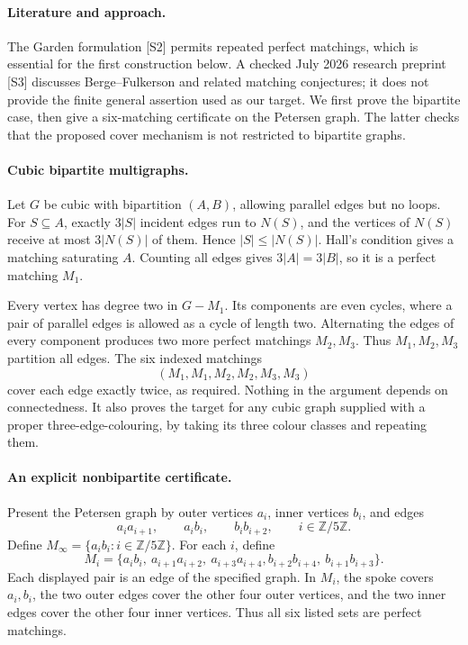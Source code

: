 \documentclass[11pt,a4paper]{article}
\begin{document}
\paragraph{Literature and approach.}
The Garden formulation [S2] permits repeated perfect matchings, which is essential for the first construction below. A checked July 2026 research preprint [S3] discusses Berge--Fulkerson and related matching conjectures; it does not provide the finite general assertion used as our target. We first prove the bipartite case, then give a six-matching certificate on the Petersen graph. The latter checks that the proposed cover mechanism is not restricted to bipartite graphs.

\paragraph{Cubic bipartite multigraphs.}
Let $G$ be cubic with bipartition $(A,B)$, allowing parallel edges but no loops. For $S\subseteq A$, exactly $3|S|$ incident edges run to $N(S)$, and the vertices of $N(S)$ receive at most $3|N(S)|$ of them. Hence $|S|\le |N(S)|$. Hall's condition gives a matching saturating $A$. Counting all edges gives $3|A|=3|B|$, so it is a perfect matching $M_1$.

Every vertex has degree two in $G-M_1$. Its components are even cycles, where a pair of parallel edges is allowed as a cycle of length two. Alternating the edges of every component produces two more perfect matchings $M_2,M_3$. Thus $M_1,M_2,M_3$ partition all edges. The six indexed matchings
\[
 (M_1,M_1,M_2,M_2,M_3,M_3)
\]
cover each edge exactly twice, as required. Nothing in the argument depends on connectedness. It also proves the target for any cubic graph supplied with a proper three-edge-colouring, by taking its three colour classes and repeating them.

\paragraph{An explicit nonbipartite certificate.}
Present the Petersen graph by outer vertices $a_i$, inner vertices $b_i$, and edges
\[
 a_i a_{i+1},\qquad a_i b_i,\qquad b_i b_{i+2},\qquad i\in\mathbb Z/5\mathbb Z.
\]
Define $M_\infty=\{a_i b_i:i\in\mathbb Z/5\mathbb Z\}$. For each $i$, define
\[
 M_i=\{a_i b_i,\ a_{i+1}a_{i+2},\ a_{i+3}a_{i+4},
 b_{i+2}b_{i+4},\ b_{i+1}b_{i+3}\}.
\]
Each displayed pair is an edge of the specified graph. In $M_i$, the spoke covers $a_i,b_i$, the two outer edges cover the other four outer vertices, and the two inner edges cover the other four inner vertices. Thus all six listed sets are perfect matchings.
\end{document}
